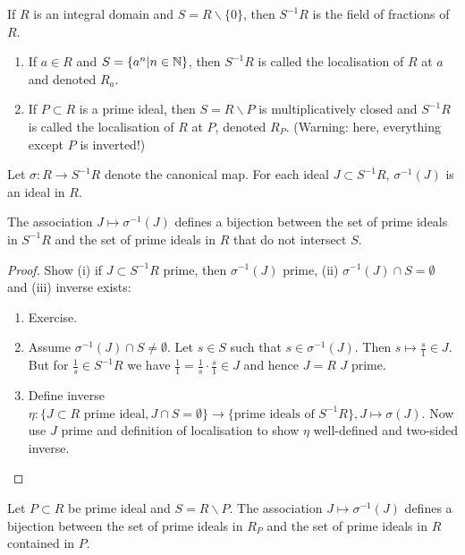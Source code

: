 \documentclass[a4paper,11pt]{article}
\begin{document}
			\begin{eg}
				If $R$ is an integral domain and $S=R\backslash\{0\}$, then $S^{-1}R$ is the field of fractions of $R$.
			\end{eg}

			\begin{eg}
				\begin{enumerate}
					\item If $a\in R$ and $S=\{a^n|n\in\mathbb{N}\}$, then $S^{-1}R$ is called the localisation of $R$ at $a$ and denoted $R_a$.
					\item If $P\subset R$ is a prime ideal, then $S=R\backslash P$ is multiplicatively closed and $S^{-1}R$ is called the localisation of $R$ at $P$, denoted $R_P$. (Warning: here, everything except $P$ is inverted!)
				\end{enumerate}
			\end{eg}

			Let $\sigma:R\rightarrow S^{-1}R$ denote the canonical map. For each ideal $J\subset S^{-1}R$, $\sigma^{-1}(J)$ is an ideal in $R$.

			\begin{prop}
				The association $J\mapsto\sigma^{-1}(J)$ defines a bijection between the set of prime ideals in $S^{-1}R$ and the set of prime ideals in $R$ that do not intersect $S$.
			\end{prop}
			\begin{proof}
				Show (i) if $J\subset S^{-1}R$ prime, then $\sigma^{-1}(J)$ prime, (ii) $\sigma^{-1}(J)\cap S=\emptyset$ and (iii) inverse exists:
				\begin{enumerate}
					\item Exercise.
					\item Assume $\sigma^{-1}(J)\cap S\neq\emptyset$. Let $s\in S$ such that $s\in\sigma^{-1}(J)$. Then $s\mapsto\frac{s}{1}\in J$. But for $\frac{1}{s}\in S^{-1}R$ we have $\frac{1}{1}=\frac{1}{s}\cdot\frac{s}{1}\in J$ and hence $J=R$ \contradiction $J$ prime.
					\item Define inverse $\eta:\{J\subset R\text{ prime ideal}, J\cap S=\emptyset\}\rightarrow\{\text{prime ideals of $S^{-1}R$}\},J\mapsto\sigma(J)$. Now use $J$ prime and definition of localisation to show $\eta $ well-defined and two-sided inverse.  
				\end{enumerate}
			\end{proof}

			\begin{cor}
				Let $P\subset R$ be prime ideal and $S=R\backslash P$. The association $J\mapsto\sigma^{-1}(J)$ defines a bijection between the set of prime ideals in $R_P$ and the set of prime ideals in $R$ contained in $P$.
			\end{cor}
\end{document}
